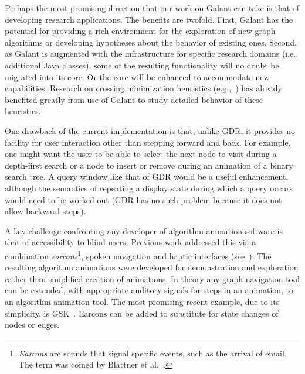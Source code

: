Perhaps the most promising direction that our work on Galant can take is
that of developing research applications.
The benefits are twofold.
First, Galant has the potential for providing a rich environment for
the exploration of new graph algorithms or developing hypotheses about the
behavior of existing ones.
Second, as Galant is augmented with the infrastructure for specific research
domains (i.e., additional Java classes), some of the resulting functionality
will no doubt be migrated into its core. Or the core will be enhanced to
accommodate new capabilities.
Research on crossing minimization heuristics (e.g.,~\cite{2016-SEA-Stallmann}) has
already benefited greatly from use of Galant to study detailed behavior of these heuristics.

One drawback of the current implementation is
that, unlike GDR, it provides no facility for user interaction other than stepping forward
and back.
For example, one might want the user to be able to select the next node to
visit during a depth-first search or a node to insert or remove during an animation of
a binary search tree.
A query window like that of GDR would be a useful enhancement, although the semantics of
repeating a display state during which a query occurs would need to be worked out
(GDR has no such problem because it does not allow backward steps).


A key challenge confronting any developer of algorithm animation
software is that of accessibility to blind users.
Previous work addressed this via a combination \emph{earcons}\footnote{
\emph{Earcons} are sounds that signal specific events, such as the arrival of email. The term was coined by Blattner et al.~\cite{1989-HCI-Blattner-earcons}.
}, spoken navigation
and haptic interfaces
(see~\cite{2002-SoftViz-Baloian,2005-SCCC-Baloian,2002-Diagrams-Bennett}).
The resulting algorithm animations were developed for demonstration and exploration rather than simplified
creation of
animations.
In theory any graph navigation tool can be extended, with appropriate auditory
signals for steps in an animation, to an algorithm animation tool.
The most promising recent example, due to its simplicity, is GSK~\cite{2013-SIGCSE-Balik}.
Earcons can be added to substitute for state changes of nodes or edges.

